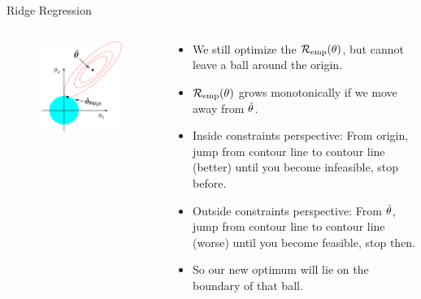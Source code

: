 \begin{vbframe}{Ridge Regression}
\framebreak
  
\begin{columns}
\begin{column}{0.5\textwidth}
\begin{figure}
\includegraphics[width=\textwidth]{figure_man/ridge_hat.png}
\end{figure}
\end{column}

\begin{column}{0.5\textwidth}
\begin{footnotesize} 
\begin{itemize}
  \item We still optimize the $\mathcal{R}_{\text{emp}}(\theta)$, but cannot leave a ball around the origin.
  \item $\mathcal{R}_{\text{emp}}(\theta)$ grows monotonically if we move away from $\hat{\theta}$.
  \item Inside constraints perspective: From origin, jump from contour line to contour line (better) until you become infeasible, stop before.
\item Outside constraints perspective: From $\hat{\theta}$, jump from contour line to contour line (worse) until you become feasible, stop then.
  \item So our new optimum will lie on the boundary of that ball.
\end{itemize}
\end{footnotesize}
\end{column}
\end{columns}


\end{vbframe}



